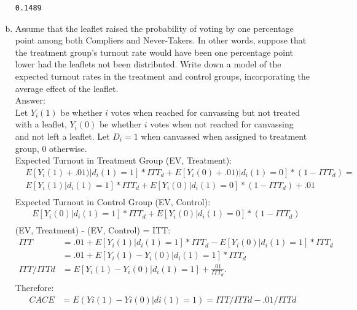 \documentclass[11pt,notitlepage]{article}\usepackage[]{graphicx}\usepackage[]{color}
\makeatletter
\newenvironment{kframe}{%
 \def\at@end@of@kframe{}%
 \ifinner\ifhmode%
  \def\at@end@of@kframe{\end{minipage}}%
  \begin{minipage}{\columnwidth}%
 \fi\fi%
 \def\FrameCommand##1{\hskip\@totalleftmargin \hskip-\fboxsep
 \colorbox{shadecolor}{##1}\hskip-\fboxsep
     \hskip-\linewidth \hskip-\@totalleftmargin \hskip\columnwidth}%
 \MakeFramed {\advance\hsize-\width
   \@totalleftmargin\z@ \linewidth\hsize
   \@setminipage}}%
 {\par\unskip\endMakeFramed%
 \at@end@of@kframe}
\newenvironment{knitrout}{}{} %
\makeatother
\begin{document}
\begin{enumerate}[a)]
\begin{knitrout}
\begin{kframe}
    \begin{Verbatim}[commandchars=\\\{\}]
  0.1489
    \end{Verbatim}
\end{kframe}
\end{knitrout}
\item Assume that the leaflet raised the probability of voting by one percentage point among both Compliers and Never-Takers. In other words, suppose that the treatment group's turnout rate would have been one percentage point lower had the leaflets not been distributed. Write down a model of the expected turnout rates in the treatment and control groups, incorporating the average effect of the leaflet.\\
Answer:\\
Let $Y_i(1)$ be whether $i$ votes when reached for canvassing but not treated with a leaflet, $Y_i(0)$ be whether $i$ votes when not reached for canvassing and not left a leaflet. Let $D_i = 1$ when canvassed when assigned to treatment group, 0 otherwise.\\
Expected Turnout in Treatment Group (EV, Treatment):
\begin{align*}
& E[Y_i(1) + .01)|d_i(1)=1]*ITT_d + E[Y_i(0)+.01)|d_i(1)=0]*(1-ITT_d) = \\
& E[Y_i(1)|d_i(1)=1]*ITT_d + E[Y_i(0)|d_i(1)=0]*(1-ITT_d) + .01\\
\end{align*}
Expected Turnout in Control Group (EV, Control):
\begin{align*}
& E[Y_i(0)|d_i(1)=1]*ITT_d + E[Y_i(0)|d_i(1)=0]*(1-ITT_d) \\
\end{align*}
(EV, Treatment) - (EV, Control) = ITT:
\begin{align*}
ITT &= .01 + E[Y_i(1)|d_i(1)=1]*ITT_d  - E[Y_i(0)|d_i(1)=1]*ITT_d\\
&= .01 + E[Y_i(1) - Y_i(0)|d_i(1)=1]*ITT_d \\
ITT/ITTd &=  E[Y_i(1) - Y_i(0)|d_i(1)=1] + \frac{.01}{ITT_d}.\\ 
\end{align*}
Therefore:
\begin{align*}
CACE &= E (Yi(1) - Yi(0)|di(1)=1) = ITT/ITTd - .01/ITTd
\end{align*}


\end{enumerate}
\end{document}
